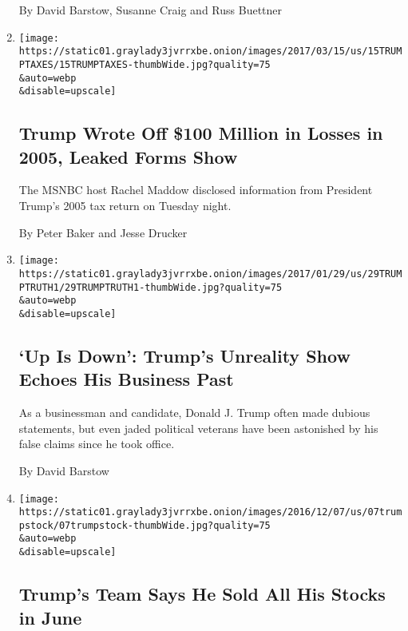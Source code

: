 \begin{enumerate}
  By David Barstow, Susanne Craig and Russ Buettner
\item
  \href{/2017/03/14/us/politics/donald-trump-taxes.html}{}

  \texttt{[image: https://static01.graylady3jvrrxbe.onion/images/2017/03/15/us/15TRUMPTAXES/15TRUMPTAXES-thumbWide.jpg?quality=75\\\&auto=webp\\\&disable=upscale]}

  \hypertarget{trump-wrote-off-100-million-in-losses-in-2005-leaked-forms-show}{%
  \subsection{Trump Wrote Off \$100 Million in Losses in 2005, Leaked
  Forms
  Show}\label{trump-wrote-off-100-million-in-losses-in-2005-leaked-forms-show}}

  The MSNBC host Rachel Maddow disclosed information from President
  Trump's 2005 tax return on Tuesday night.

  By Peter Baker and Jesse Drucker
\item
  \href{/2017/01/28/us/politics/donald-trump-truth.html}{}

  \texttt{[image: https://static01.graylady3jvrrxbe.onion/images/2017/01/29/us/29TRUMPTRUTH1/29TRUMPTRUTH1-thumbWide.jpg?quality=75\\\&auto=webp\\\&disable=upscale]}

  \hypertarget{up-is-down-trumps-unreality-show-echoes-his-business-past}{%
  \subsection{`Up Is Down': Trump's Unreality Show Echoes His Business
  Past}\label{up-is-down-trumps-unreality-show-echoes-his-business-past}}

  As a businessman and candidate, Donald J. Trump often made dubious
  statements, but even jaded political veterans have been astonished by
  his false claims since he took office.

  By David Barstow
\item
  \href{/2016/12/06/us/politics/donald-trump-business-stocks.html}{}

  \texttt{[image: https://static01.graylady3jvrrxbe.onion/images/2016/12/07/us/07trumpstock/07trumpstock-thumbWide.jpg?quality=75\\\&auto=webp\\\&disable=upscale]}

  \hypertarget{trumps-team-says-he-sold-all-his-stocks-in-june}{%
  \subsection{Trump's Team Says He Sold All His Stocks in
  June}\label{trumps-team-says-he-sold-all-his-stocks-in-june}}


\end{enumerate}
